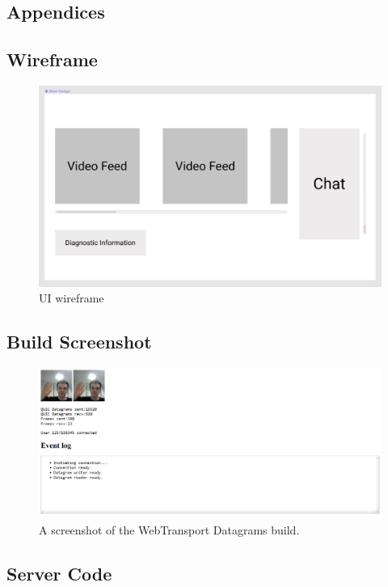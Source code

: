 \documentclass{l4proj}
\begin{document}
\begin{appendices}

\chapter{Appendices}

\section{Wireframe}

\begin{figure}[h]
    \centering
    \includegraphics[width=0.7\linewidth]{images/wireframe.png}
	\caption{UI wireframe}
    \label{wireframe}
\end{figure}

\section{Build Screenshot}

\begin{figure}[h]
    \centering
    \includegraphics[width=0.95\linewidth]{images/webtransport build.png}
	\caption{A screenshot of the WebTransport Datagrams build.}
    \label{wt_build_screenshot}
\end{figure}

\section{Server Code}


\end{appendices}
\end{document}
